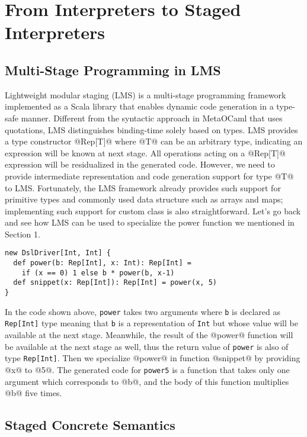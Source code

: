 \section{From Interpreters to Staged Interpreters} \label{stagedinterp}

\subsection{Multi-Stage Programming in LMS}

Lightweight modular staging (LMS) \cite{DBLP:conf/gpce/RompfO10} is a
multi-stage programming framework implemented as a Scala library that enables
dynamic code generation in a type-safe manner. Different from the syntactic
approach in MetaOCaml \cite{DBLP:conf/flops/Kiselyov14,
DBLP:conf/gpce/CalcagnoTHL03} that uses quotations, LMS distinguishes
binding-time solely based on types. LMS provides a type constructor @Rep[T]@
where @T@ can be an arbitrary type, indicating an expression will be known at
next stage. All operations acting on a @Rep[T]@ expression will be residualized
in the generated code. However, we need to provide intermediate representation
and code generation support for type @T@ to LMS. Fortunately, the LMS framework
already provides such support for primitive types and commonly used data
structure such as arrays and maps; implementing such support for custom class is
also straightforward. Let's go back and see how LMS can be used to specialize
the power function we mentioned in Section 1.

\begin{lstlisting}
new DslDriver[Int, Int] {
  def power(b: Rep[Int], x: Int): Rep[Int] =
    if (x == 0) 1 else b * power(b, x-1)
  def snippet(x: Rep[Int]): Rep[Int] = power(x, 5)
}
\end{lstlisting}

In the code shown above, \texttt{power} takes two arguments where \texttt{b} is
declared as \texttt{Rep[Int]} type meaning that \texttt{b} is a representation
of \texttt{Int} but whose value will be available at the next stage. Meanwhile,
the result of the @power@ function will be available at the next stage as well,
thus the return value of \texttt{power} is also of type \texttt{Rep[Int]}. Then
we specialize @power@ in function @snippet@ by providing @x@ to @5@. The
generated code for \texttt{power5} is a function that takes only one argument
which corresponds to @b@, and the body of this function multiplies @b@ five
times.

\subsection{Staged Concrete Semantics}

